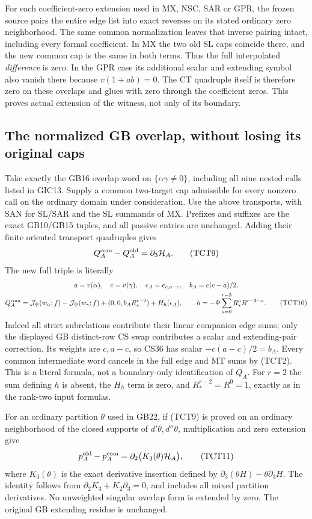 For each coefficient-zero extension used in MX, NSC, SAR or GPR,
the frozen source pairs the entire edge list into exact reverses
on its stated ordinary zero neighborhood.  The same common
normalization leaves that inverse pairing intact, including every
formal coefficient.  In MX the two old SL caps coincide there,
and the new common cap is the same in both terms.  Thus the full
interpolated \emph{difference} is zero.  In the GPR case its
additional scalar and extending symbol also vanish there because
$v(1+ab)=0$.  The CT quadruple itself is therefore zero on these
overlaps and glues with zero through the coefficient zeros.
This proves actual extension of the witness, not only of its boundary.

\subsection{The normalized GB overlap, without losing its original caps}

Take exactly the GB16 overlap word on $\{\alpha\gamma\ne0\}$,
including all nine nested calls listed in GIC13.  Supply a common
two-target cap admissible for every nonzero call on the ordinary
domain under consideration.  Use the above transports, with SAN
for SL/SAR and the SL summands of MX.  Prefixes and suffixes are
the exact GB10/GB15 tuples, and all passive entries are unchanged.
Adding their finite oriented transport quadruples gives
\[
 Q_A^{\rm com}-Q_A^{\rm old}=\partial_3\mathcal H_A.
 \tag{TCT9}
\]
The new full triple is literally
\[
\begin{gathered}
 a=v(\alpha),\quad c=v(\gamma),\quad
 \epsilon_A=e_{c,a-c},\quad b_A=c(c-a)/2,\\
 Q_A^{\rm com}=
 \mathcal J_\Psi(w_\alpha;f)-\mathcal J_\Psi(w_\gamma;f)
 +(0,0,b_A R_*^{r-2})+H_h(\epsilon_A),
 \qquad h=-\Psi\sum_{a=0}^{r-3}R_*^aR^{r-3-a}.
 \tag{TCT10}
\end{gathered}
\]
Indeed all strict subrelations contribute their linear companion
edge sums; only the displayed GB distinct-row CS swap contributes
a scalar and extending-pair correction.  Its weights are
$c,a-c$, so CS36 has scalar $-c(a-c)/2=b_A$.
Every common intermediate word cancels in the full edge and MT
sums by (TCT2).  This is a literal formula, not a boundary-only
identification of $Q_A$.
For $r=2$ the sum defining $h$ is absent, the $H_h$ term is zero,
and $R_*^{r-2}=R^0=1$, exactly as in the rank-two input formulas.

For an ordinary partition $\theta$ used in GB22, if (TCT9) is
proved on an ordinary neighborhood of the closed supports of
$d'\theta,d''\theta$, multiplication and zero extension give
\[
 p_A^{\rm old}-p_A^{\rm com}
       =\partial_2\bigl(K_3(\theta)\mathcal H_A\bigr),
 \tag{TCT11}
\]
where $K_3(\theta)$ is the exact derivative insertion defined by
$\partial_3(\theta H)-\theta\partial_3H$.  The identity follows
from $\partial_2K_3+K_2\partial_3=0$, and includes all mixed
partition derivatives.  No unweighted singular overlap form is
extended by zero.  The original GB extending residue is unchanged.

